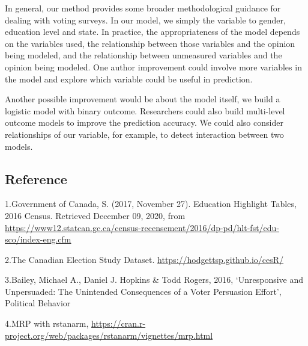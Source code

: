 \documentclass[
]{article}
\begin{document}
In general, our method provides some broader methodological guidance for
dealing with voting surveys. In our model, we simply the variable to
gender, education level and state. In practice, the appropriateness of
the model depends on the variables used, the relationship between those
variables and the opinion being modeled, and the relationship between
unmeasured variables and the opinion being modeled. One author
improvement could involve more variables in the model and explore which
variable could be useful in prediction.

Another possible improvement would be about the model itself, we build a
logistic model with binary outcome. Researchers could also build
multi-level outcome models to improve the prediction accuracy. We could
also consider relationships of our variable, for example, to detect
interaction between two models.

\hypertarget{reference}{%
\subsection{Reference}\label{reference}}

1.Government of Canada, S. (2017, November 27). Education Highlight
Tables, 2016 Census. Retrieved December 09, 2020, from
\url{https://www12.statcan.gc.ca/census-recensement/2016/dp-pd/hlt-fst/edu-sco/index-eng.cfm}

2.The Canadian Election Study Dataset.
\url{https://hodgettsp.github.io/cesR/}

3.Bailey, Michael A., Daniel J. Hopkins \& Todd Rogers, 2016,
`Unresponsive and Unpersuaded: The Unintended Consequences of a Voter
Persuasion Effort', Political Behavior

4.MRP with rstanarm,
\url{https://cran.r-project.org/web/packages/rstanarm/vignettes/mrp.html}
\end{document}
